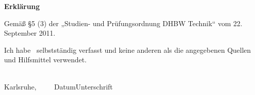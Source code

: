 
\newpage
\thispagestyle{empty}

\begin{center}
\Large\bfseries Erkl\"arung
\end{center}

\noindent
Gem\"a\ss{} \S5 (3)  der „Studien- und Pr\"ufungsordnung DHBW Technik“ vom 22. September 2011.

\medskip
\noindent
Ich habe \WasErklaerung\ selbstst\"andig verfasst und
keine anderen als die angegebenen Quellen und Hilfsmittel verwendet.

\vspace{3cm}
\noindent
\underline{\hspace{4cm}}\hfill\underline{\hspace{6cm}}\\
Karlsruhe,~~~~~Datum\hfill Unterschrift\hspace{4cm}\\ \\ \\


